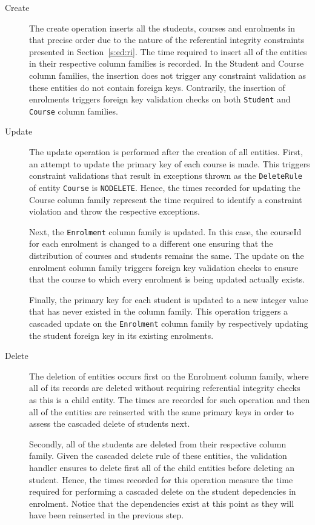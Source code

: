 \begin{description}
\item[Create] The create operation inserts all the students, courses and enrolments in
that precise order due to the nature of the referential integrity constraints
presented in Section~\ref{s:ed:ri}. The time required to insert all of the
entities in their respective column families  is recorded. In the Student and
Course column families, the insertion does not trigger any constraint validation
as these entities do not contain foreign keys. Contrarily, the insertion of
enrolments triggers foreign key validation checks on both \texttt{Student} and
\texttt{Course} column families.
\item[Update] The update operation is performed after the creation of all entities.
First, an attempt to update the primary key of each course is made. This
triggers constraint validations that result in exceptions thrown as the
\texttt{DeleteRule} of entity \texttt{Course} is \texttt{NODELETE}. Hence, the
times recorded for updating the Course column family represent the time required to identify a
constraint violation and throw the respective exceptions.
			
Next, the \texttt{Enrolment} column family is updated. In this case, the
courseId for each enrolment is changed to a different one ensuring that the distribution of
courses and students remains the same. The update on the enrolment column family
triggers foreign key validation checks to ensure that the course to which every
enrolment is being updated actually exists.
			
Finally, the primary key for each student is updated to a new integer value that
has never existed in the column family. This operation triggers a cascaded
update on the \texttt{Enrolment} column family by respectively updating the
student foreign key in its existing enrolments.
\item[Delete]The deletion of entities occurs first on the Enrolment column family,
where all of its records are deleted without requiring referential integrity
checks as this is a child entity. The times are recorded for such operation and
then all of the entities are reinserted with the same primary keys in order to
 assess the cascaded delete of students next.
		
Secondly, all of the students are deleted from their respective column family.
Given the cascaded delete rule of these entities, the validation handler ensures to delete first
all of the child entities before deleting an student. Hence, the times recorded
for this operation measure the time required for performing a cascaded delete on
the student depedencies in enrolment. Notice that the dependencies exist at this
point as they will have been reinserted in the previous step.
		

\end{description}
